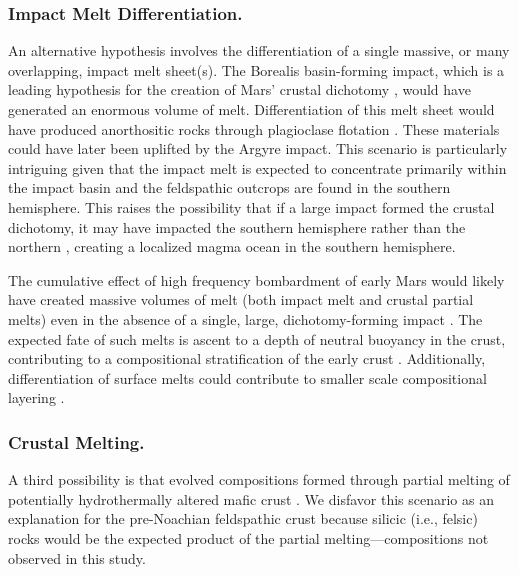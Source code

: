 \documentclass[11pt]{article}
\begin{document}
\subsubsection*{Impact Melt Differentiation.} 

An alternative hypothesis involves the differentiation of a single massive, or many overlapping, impact melt sheet(s). The Borealis basin-forming impact, which is a leading hypothesis for the creation of Mars' crustal dichotomy \citep{Don1984, Andrews-Hanna2008, Marinova2008, Nimmo2008}, would have generated an enormous volume of melt. Differentiation of this melt sheet would have produced anorthositic rocks through plagioclase flotation \citep{Koeppel2020, Manske2021}. These materials could have later been uplifted by the Argyre impact. This scenario is particularly intriguing given that the impact melt is expected to concentrate primarily within the impact basin \citep{Marinova2008, Ballantyne2023} and the feldspathic outcrops are found in the southern hemisphere. This raises the possibility that if a large impact formed the crustal dichotomy, it may have impacted the southern hemisphere rather than the northern \citep{Reese2010, Golabek2011, Leone2014, Ballantyne2023, Cheng2024}, creating a localized magma ocean in the southern hemisphere.

The cumulative effect of high frequency bombardment of early Mars would likely have created massive volumes of melt (both impact melt and crustal partial melts) even in the absence of a single, large, dichotomy-forming impact \citep{Koeppel2020, Manske2021, Black2024}. The expected fate of such melts is ascent to a depth of neutral buoyancy in the crust, contributing to a compositional stratification of the early crust \citep{Black2024}. Additionally, differentiation of surface melts could contribute to smaller scale compositional layering \citep{Koeppel2020}.

\subsubsection*{Crustal Melting.} 

A third possibility is that evolved compositions formed through partial melting of potentially hydrothermally altered mafic crust \citep{BonnetGibet2025, Bernadet2025}. We disfavor this scenario as an explanation for the pre-Noachian feldspathic crust because silicic (i.e., felsic) rocks would be the expected product of the partial melting---compositions not observed in this study.
\end{document}
